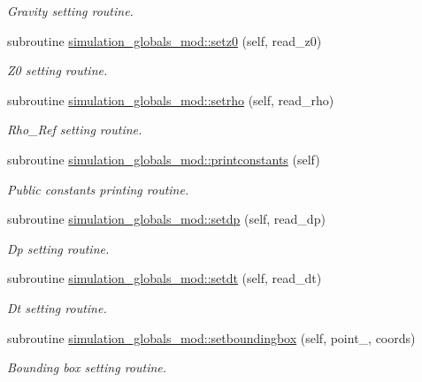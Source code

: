 \begin{DoxyCompactItemize}
\begin{DoxyCompactList}\small\item\em Gravity setting routine. \end{DoxyCompactList}\item 
subroutine \mbox{\hyperlink{namespacesimulation__globals__mod_a64b1d91147c1cd5898fec8f23d56a65d}{simulation\+\_\+globals\+\_\+mod\+::setz0}} (self, read\+\_\+z0)
\begin{DoxyCompactList}\small\item\em Z0 setting routine. \end{DoxyCompactList}\item 
subroutine \mbox{\hyperlink{namespacesimulation__globals__mod_a68a87c39cf88bad353e28e367a721ed4}{simulation\+\_\+globals\+\_\+mod\+::setrho}} (self, read\+\_\+rho)
\begin{DoxyCompactList}\small\item\em Rho\+\_\+\+Ref setting routine. \end{DoxyCompactList}\item 
subroutine \mbox{\hyperlink{namespacesimulation__globals__mod_a20ba28d72a9bea823d9373a94f97026e}{simulation\+\_\+globals\+\_\+mod\+::printconstants}} (self)
\begin{DoxyCompactList}\small\item\em Public constants printing routine. \end{DoxyCompactList}\item 
subroutine \mbox{\hyperlink{namespacesimulation__globals__mod_acb8e3762572266b40a0deb166dded33a}{simulation\+\_\+globals\+\_\+mod\+::setdp}} (self, read\+\_\+dp)
\begin{DoxyCompactList}\small\item\em Dp setting routine. \end{DoxyCompactList}\item 
subroutine \mbox{\hyperlink{namespacesimulation__globals__mod_aecf75eeccef4eeae6d10ab26cf2dcfcf}{simulation\+\_\+globals\+\_\+mod\+::setdt}} (self, read\+\_\+dt)
\begin{DoxyCompactList}\small\item\em Dt setting routine. \end{DoxyCompactList}\item 
subroutine \mbox{\hyperlink{namespacesimulation__globals__mod_a412b0779703630189e2ea14e4b390864}{simulation\+\_\+globals\+\_\+mod\+::setboundingbox}} (self, point\+\_\+, coords)
\begin{DoxyCompactList}\small\item\em Bounding box setting routine. \end{DoxyCompactList}\item 

\end{DoxyCompactItemize}
